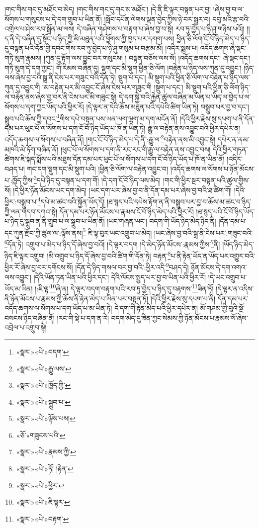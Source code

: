 །གང་གིས་གང་དུ་མཐོང་བ་མེད། །གང་གིས་གང་དུ་གང་མ་མཐོང་། །དེ་ནི་ཇི་ལྟར་བསྟན་པར་བྱ། །ཞེས་བྱ་བ་ལ་སོགས་པ་གསུངས་པ་དེ་དག་གྲུབ་པ་ཡིན་ནོ། །སློབ་དཔོན་ལེགས་ལྡན་བྱེད་ཀྱིས་ཉེ་བར་སྦྱར་བ། དབུ་མའི་རྩ་བའི་འགྲེལ་པ་ཤེས་རབ་སྒྲོན་མ་ལས། དེ་བཞིན་གཤེགས་པ་བརྟག་པ་ཞེས་བྱ་བ་སྟེ། རབ་ཏུ་བྱེད་པ་ཉི་ཤུ་གཉིས་པའོ།། །།ད་ནི་དེ་བཞིན་དུ་སྟོང་པ་ཉིད་ཀྱི་མི་མཐུན་པའི་ཕྱོགས་ཀྱི་ཁྱད་པར་དགག་པས། ཕྱིན་ཅི་ལོག་ངོ་བོ་ཉིད་མེད་པ་ཉིད་དུ་བསྟན་པའི་དོན་གྱི་དབང་གིས་རབ་ཏུ་བྱེད་པ་ཉི་ཤུ་གསུམ་པ་བརྩམ་མོ། །འདིར་སྨྲས་པ། འདོད་ཆགས་ཞེ་སྡང་གཏི་མུག་རྣམས། །ཀུན་དུ་རྟོག་ལས་བྱུང་བར་གསུངས། །
བསྟན་བཅོས་ལས་སོ། །འདོད་ཆགས་དང་། ཞེ་སྡང་དང་། གཏི་མུག་དེ་དག་ཀྱང་། གོ་རིམས་བཞིན་དུ། སྡུག་དང་མི་སྡུག་ཕྱིན་ཅི་ལོག །བརྟེན་པ་ཉིད་ལས་ཀུན་དུ་འབྱུང་། །ཉིད་ལས་ཞེས་བྱ་བའི་སྒྲ་ནི་ངེས་པར་གཟུང་བའི་དོན་ཏེ། སྡུག་པ་དང་། མི་སྡུག་པའི་ཕྱིན་ཅི་ལོག་ལ་བརྟེན་པ་ཉིད་ལས་ཀུན་དུ་འབྱུང་གི །མ་བརྟེན་པར་མི་འབྱུང་ངོ་ཞེས་ངེས་པར་གཟུང་གི །སྡུག་པ་དང་། མི་སྡུག་པའི་ཕྱིན་ཅི་ལོག་ཉིད་ལ་བརྟེན་ནས་ཞེས་བྱ་བར་ནི་ངེས་པར་མི་གཟུང་སྟེ། དེ་དག་སྐྱེ་བའི་རྐྱེན་ཚུལ་བཞིན་མ་ཡིན་པ་ཡིད་ལ་བྱེད་པ་ལ་སོགས་པ་དག་ཀྱང་ཡོད་པའི་ཕྱིར་རོ། །དེ་ལྟར་ན་དེའི་ཆོས་མཐུན་པའི་དཔེའི་ཚིག་ཡིན་ཏེ། བསྒྲུབ་པར་བྱ་བ་དང་། སྒྲུབ་པའི་ཆོས་ཀྱི་དབང་\footnote{«སྣར་»«པེ་»བདག་}གིས་དཔེ་བསྟན་པས་ཡན་ལག་ལྷག་མ་དག་མངོན་ནོ། །དེའི་ཕྱིར་རྗེས་སུ་དཔག་པ་ནི་དོན་དམ་པར་ཕུང་པོ་ལ་སོགས་པ་དག་ངོ་བོ་ཉིད་ཡོད་པ་ཁོ་ན་ཡིན་ཏེ། རྒྱུ་ལ་བརྟེན་ནས་འབྱུང་བའི་ཕྱིར་དཔེར་ན། འདོད་ཆགས་ལ་སོགས་པ་བཞིན་ནོ། །གང་ངོ་བོ་ཉིད་མེད་པ་དེ་ནི་:རྒྱུ་ལ་\footnote{«སྣར་»«པེ་»རྒྱུ་ལས་}བརྟེན་ནས་མི་འབྱུང་སྟེ། དཔེར་ན་ནམ་མཁའི་མེ་ཏོག་བཞིན་ནོ། །ཕུང་པོ་ལ་སོགས་པ་དག་ནི་རང་རང་གི་རྒྱུ་ལ་བརྟེན་ནས་འབྱུང་བས། དེའི་ཕྱིར་གཏན་ཚིགས་ཇི་སྐད་སྨོས་པའི་མཐུས་དོན་དམ་པར་ཕུང་པོ་ལ་སོགས་པ་དག་ངོ་བོ་ཉིད་ཡོད་པ་ཁོ་ན་ཡིན་ནོ། །འདིར་བཤད་པ། གང་དག་སྡུག་དང་མི་སྡུག་པའི། །ཕྱིན་ཅི་ལོག་ལ་བརྟེན་འབྱུང་བ། །འདོད་ཆགས་ལ་སོགས་པ་ཉོན་མོངས་པ་:ཁྱོད་ཀྱིས་\footnote{«སྣར་»«པེ་»ཁྱོད་ཀྱི་}དཔེ་ཉིད་དུ་བསྟན་པ་དག་གོ། །དེ་དག་ངོ་བོ་ཉིད་ལས་མེད། །གང་གི་ཕྱིར་སྔར་བསྟན་པའི་ཚུལ་གྱིས་སོ། །དེ་ཕྱིར་ཉོན་མོངས་ཡང་དག་མེད། །ཡང་དག་པར་ཞེས་བྱ་བ་ནི་དོན་དམ་པར་ཞེས་བྱ་བའི་ཐ་ཚིག་གོ། །དེའི་ཕྱིར་:བསྒྲུབ་པ་\footnote{«སྣར་»«པེ་»སྒྲུབ་པ་}དཔེ་མ་ཚང་བའི་སྐྱོན་ཡོད་དོ། །ཐ་སྙད་པའི་དཔེས་རྟོག་ན་ནི་བསྒྲུབ་པར་བྱ་བ་ཆོས་མ་ཚང་བ་ཉིད་ཀྱི་ལན་གདབ་དཀའ་སྟེ། དོན་དམ་པར་ཉོན་མོངས་པ་རྣམས་ངོ་བོ་ཉིད་མེད་པའི་ཕྱིར་རོ། །ཐ་སྙད་པའི་ངོ་བོ་ཉིད་ཡོད་པ་ཉིད་དུ་སྒྲུབ་ན་ནི་གྲུབ་པ་ལ་སྒྲུབ་པ་ཡིན་ནོ། །ཡང་གཞན་ཡང་། བདག་གི་ཡོད་ཉིད་མེད་ཉིད་ནི། །དོན་དམ་པ་དང་ཀུན་རྫོབ་ཀྱི་ཚུལ་ལ་:ལྟོས་ནས།\footnote{«སྣར་»«པེ་»ལྟོས་པས།} ཇི་ལྟ་བུར་ཡང་འགྲུབ་པ་མེད། །ཡང་ཞེས་བྱ་བའི་སྒྲ་ནི་ངེས་པར་:གཟུང་བའི་\footnote{«ཅོ་»གཟུངས་པའི་}དོན་ཏེ། འགྲུབ་པ་མེད་པ་ཉིད་དོ་ཞེས་བྱ་བའོ། །དེ་ལྟར་བདག །དེ་མེད་ཉོན་མོངས་:རྣམས་ཀྱིས་\footnote{«སྣར་»«པེ་»རྣམས་ཀྱི་}ནི། །ཡོད་ཉིད་མེད་ཉིད་ཇི་ལྟར་འགྲུབ། །མི་འགྲུབ་པ་ཉིད་དོ་ཞེས་བྱ་བའི་ཚིག་གི་དོན་ཏེ། བརྟན་\footnote{«སྣར་»«པེ་»ཏོ། །རྟེན་}པ་ནི་རྟེན་ཡོད་ན་ཡོད་པར་འགྱུར་བའི་ཕྱིར་རོ་ཞེས་བྱ་བར་དགོངས་སོ། །དོན་དེ་ཉིད་གསལ་བར་བྱ་བའི་:ཕྱིར་འདི་\footnote{«སྣར་»«པེ་»ཕྱིར་}བཤད་དེ། ཉོན་མོངས་དེ་དག་འགའ་ལས་འབྱུང་། །དེའི་ཡོན་ཏན་ཡིན་པའི་ཕྱིར་དང་། དེའི་ལོངས་སྤྱད་པར་བྱ་བ་ཡིན་པའི་ཕྱིར་རོ། །དེ་ཡང་འགྲུབ་པ་ཡོད་མ་ཡིན། །:ཇི་ལྟ་\footnote{«སྣར་»«པེ་»ཇི་ལྟར་}ཞེ་ན། དེ་ལྟར་བདག་བརྟག་པའི་རབ་ཏུ་བྱེད་པ་ཉིད་དུ་བརྟགས་\footnote{«སྣར་»«པེ་»བརྟག་}ཟིན་ཏོ། །དེ་ལྟར་ན་འདིས་ནི་ཉོན་མོངས་པ་རྣམས་ཀྱི་ཆོས་ནི་རྟེན་མེད་པ་ཡིན་པར་བསྟན་ཏོ། །དེའི་ཕྱིར་རྗེས་སུ་དཔག་པ་ནི། དོན་དམ་པར་འདོད་ཆགས་ལ་སོགས་པ་དག་ཡོད་པ་མ་ཡིན་ཏེ། དེ་དག་གི་རྟེན་མེད་པའི་ཕྱིར་དཔེར་ན། མོ་གཤམ་གྱི་བུའི་སྔོ་བསངས་ཉིད་བཞིན་ནོ། །རང་གི་སྡེ་པ་དག་ན་རེ། བདག་མེད་དུ་ཟིན་ཀྱང་སེམས་ཀྱི་ཉོན་མོངས་པ་རྣམས་སོ་ཞེས་འབྲེལ་པ་འགྲུབ་སྟེ། 